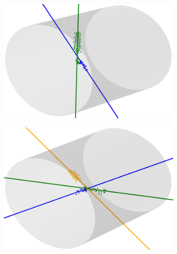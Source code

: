 \documentclass[a4paper,12pt,oneside]{book}
\begin{document}
\begin{figure}[H]
\centering
    \begin{subfigure}[b]{0.48\textwidth}
        \centering
        \includegraphics[scale=0.4]{figs/cl_ex1.png}
        \caption{}
        \label{subfig:cl_ex1}
    \end{subfigure}%
    \hfill
    \begin{subfigure}[b]{0.48\textwidth}
        \centering
        \includegraphics[scale=0.4]{figs/cl_ex2.png}
        \caption{}
        \label{subfig:cl_ex2}
    \end{subfigure}
    \begin{subfigure}[b]{0.48\textwidth}
        \centering

\end{subfigure}
\end{figure}
\end{document}
